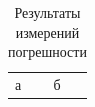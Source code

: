 \begin{table}
  \begin{tabular}{ll}
    а & б \\
  \end{tabular}
  \caption{Результаты измерений погрешности} %
  \label{tab:results}
\end{table}
